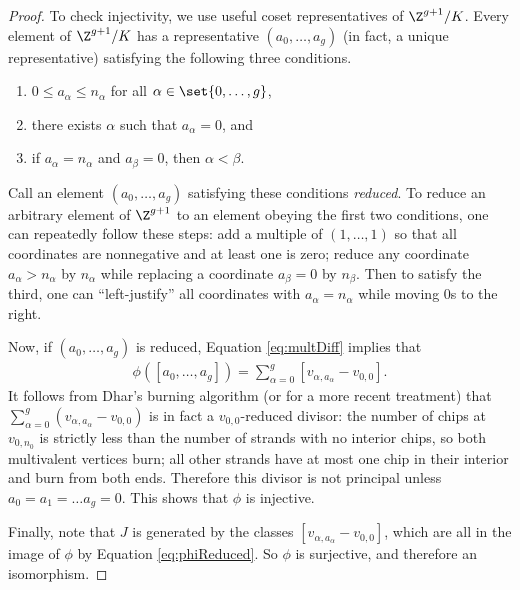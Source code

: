 \begin{proof}
    To check injectivity, we use useful coset representatives of $\Z^{g+1}/K$. Every element of $\Z^{g+1}/K$ has a representative $(a_0,\dots,a_g)$ (in fact, a unique representative) satisfying the following three conditions.
    \begin{enumerate}[label = \arabic*)]
        \item $0\leq a_\alpha \leq n_\alpha$ for all $\alpha \in \set{0,\dots,g}$,
        \item there exists $\alpha$ such that $a_\alpha = 0$, and
        \item if $a_\alpha = n_\alpha$ and $a_\beta = 0$, then $\alpha < \beta$.
    \end{enumerate}
    Call an element $(a_0, \ldots, a_g)$ satisfying these conditions \emph{reduced}.
    To reduce an arbitrary element of $\Z^{g+1}$ to an element obeying the first two conditions, one can repeatedly follow these steps: add a multiple of $(1,\ldots,1)$ so that all coordinates are nonnegative and at least one is zero; reduce any coordinate $a_\alpha > n_\alpha$ by $n_\alpha$ while replacing a coordinate $a_\beta = 0$ by $n_\beta$. Then to satisfy the third, one can ``left-justify'' all coordinates with $a_\alpha = n_\alpha$ while moving $0$s to the right.
    
    Now, if $(a_0, \ldots, a_g)$ is reduced, Equation \eqref{eq:multDiff} implies that
    \begin{align} \label{eq:phiReduced}
    \phi( [a_0, \ldots, a_g]) = \sum_{\alpha=0}^g [ v_{\alpha, a_\alpha} - v_{0,0} ].
    \end{align}
    It follows from Dhar's burning algorithm \cite{Dhar90} (or \cite[\S 3.4]{corry2018divisors} for a more recent treatment) that $\sum_{\alpha=0}^g (v_{\alpha, a_\alpha} - v_{0,0})$ is in fact a $v_{0,0}$-reduced divisor: the number of chips at $v_{0,n_0}$ is strictly less than the number of strands with no interior chips, so both multivalent vertices burn; all other strands have at most one chip in their interior and burn from both ends. Therefore this divisor is not principal unless $a_0 = a_1 = \ldots a_g = 0$. This shows that $\phi$ is injective. 
    
    Finally, note that $J$ is generated by the classes $[v_{\alpha,a_\alpha} - v_{0,0}]$, which are all in the image of $\phi$ by Equation \eqref{eq:phiReduced}. So $\phi$ is surjective, and therefore an isomorphism.
\end{proof}

